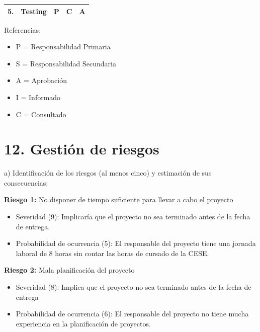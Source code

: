 \documentclass[11pt]{charter}
\begin{document}
\begin{table}[htbp]
\begin{tabular}{|c|c|c|c|c|}
5.                                                                                             & Testing                                                      & P                                                                                & C                                                                            & A                                                                             \\ \hline
\end{tabular}
\end{table}

{\footnotesize
Referencias:
\begin{itemize}
	\item P = Responsabilidad Primaria
	\item S = Responsabilidad Secundaria
	\item A = Aprobación
	\item I = Informado
	\item C = Consultado
\end{itemize}
} %

\newpage

\section{12. Gestión de riesgos}
\label{sec:riesgos}

a) Identificación de los riesgos (al menos cinco) y estimación de sus consecuencias:
 
\textbf{Riesgo 1:} No disponer de tiempo suficiente para llevar a cabo el proyecto
\begin{itemize}
\item Severidad (9): Implicaría que el proyecto no sea terminado antes de la fecha de entrega.
\item Probabilidad de ocurrencia (5): El responsable del proyecto tiene una jornada laboral de 8 horas sin contar las horas de cursado de la CESE. 
\end{itemize}   

\textbf{Riesgo 2:} Mala planificación del proyecto
\begin{itemize}
\item Severidad (8): Implica que el proyecto no sea terminado antes de la fecha de entrega
\item Probabilidad de ocurrencia (6): El responsable del proyecto no tiene mucha experiencia en la planificación de proyectos.
\end{itemize}
\end{document}
